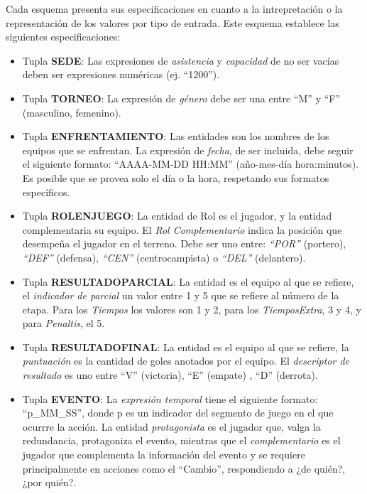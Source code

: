 Cada esquema presenta sus especificaciones en cuanto a la intrepretación o la representación de los 
valores por tipo de entrada. Este esquema establece las siguientes especificaciones:

    \begin{itemize}
        \item Tupla \textbf{SEDE}: Las expresiones de \textit{asistencia} y \textit{capacidad} de no ser vacías deben ser expresiones numéricas (ej. “1200”).
        \item Tupla \textbf{TORNEO}: La expresión de \textit{género} debe ser una entre “M” y “F” (masculino, femenino). 
        \item Tupla \textbf{ENFRENTAMIENTO}: Las entidades son los nombres de los equipos que se enfrentan. La expresión de \textit{fecha}, de ser incluida, debe seguir
        el siguiente formato: “AAAA-MM-DD HH:MM” (año-mes-día hora:minutos). Es posible que se provea solo el día o la hora, respetando sus formatos específicos.
        \item Tupla \textbf{ROLENJUEGO}: La entidad de Rol es el jugador, y la entidad complementaria su equipo. El \textit{Rol Complementario} indica la posición que 
        desempeña el jugador en el terreno. Debe ser uno entre: \textit{“POR”} (portero), \textit{“DEF”} (defensa), \textit{“CEN”} (centrocampista) o \textit{“DEL”} (delantero).
        \item Tupla \textbf{RESULTADOPARCIAL}: La entidad es el equipo al que se refiere, el \textit{indicador de parcial} un valor entre 1 y 5 que se refiere al número de la etapa. Para  
        los \textit{Tiempos} los valores son 1 y 2, para los \textit{TiemposExtra}, 3 y 4, y para \textit{Penaltis}, el 5.
        \item Tupla \textbf{RESULTADOFINAL}: La entidad es el equipo al que se refiere, la \textit{puntuación} es la cantidad de goles anotados por el equipo. El \textit{descriptor de 
        resultado} es uno entre “V” (victoria), “E” (empate) , “D” (derrota).
        \item Tupla \textbf{EVENTO}: La \textit{expresión temporal} tiene el siguiente formato: “p\_MM\_SS”, donde p es un indicador del segmento de juego en el que ocurrre la acción. 
        La entidad \textit{protagonista} es el jugador que, valga la redundancia, protagoniza el evento, mientras que el \textit{complementario} es el jugador que complementa la 
        información del evento y se requiere principalmente en acciones como el “Cambio”, respondiendo a ¿de quién?, ¿por quién?.
    \end{itemize}

